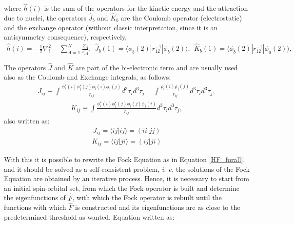 \noindent where $\widehat{h}(i)$ is the sum of the operators for the kinetic
energy and the attraction due to nuclei, the operators $\hat{J}_b$ and
$\hat{K}_b$ are the Coulomb operator (electrostatic) and the exchange operator
(without classic interpretation, since it is an antisymmetry consequence),
respectively,
%
\begin{align}
  \widehat{h}(i) = -\frac{1}{2}\nabla^{2}_{i} -\sum_{A=1}^{N}\frac{Z_{A}}{r_{iA}}, \ \ 
  \hat{J}_b (1) = \langle\phi_{b}(2) | r_{12}^{-1} | \phi_{b}(2)\rangle , \ \ 
  \hat{K}_b (1) = \langle\phi_{b}(2) | r_{12}^{-1} | \phi_{a}(2)\rangle ,
\end{align}

\noindent The operators $\hat{J}$ and $\hat{K}$ are part of the bi-electronic
term and are usually used also as the Coulomb and Exchange integrals, as
follows:
%
\begin{align}
J_{ij} \equiv \int\frac{\phi_{i}^{\star}(i)\phi_{j}^{\star}(j)\phi_{i}(i)\phi_{j}(j)}{r_{ij}}
d^{3}\tau_{i}d^{3}\tau_{j} =
\int\frac{\rho_{i}(i)\rho_{j}(j)}{r_{ij}}d^{3}\tau_{i}d^{3}\tau_{j},
\end{align}
\begin{align}
K_{ij} \equiv \int\frac{\phi_{i}^{\star}(i)\phi_{j}^{\star}(j)\phi_{i}(j)\phi_{j}(i)}{r_{ij}}
d^{3}\tau_{i}d^{3}\tau_{j} ,
\end{align}
%
\noindent also written as:
\begin{align}
  J_{ij} = \langle ij | ij \rangle = (ii|jj)
\end{align}
\begin{align}
  K_{ij} = \langle ij | ji \rangle = (ij|ji)
\end{align}

With this it is possible to rewrite the Fock Equation as in Equation
\ref{HF_forall}, and it should be solved as a self-consistent problem,
\textit{i. e.} the solutions of the Fock Equation are obtained by an iterative
process. Hence, it is necessary to start from an initial spin-orbital set, from
which the Fock operator is built and determine the eigenfunctions of
$\widehat{F}$, with which the Fock operator is rebuilt until the functions with
which $\widehat{F}$ is constructed and its eigenfunctions are as close to the
predetermined threshold as wanted. Equation written as:

